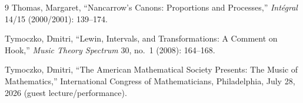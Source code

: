 \documentclass[11pt]{article}
\theoremstyle{plain}
\theoremstyle{definition}
\theoremstyle{remark}
\begin{document}
\begin{thebibliography}{9}
Thomas, Margaret, ``Nancarrow's Canons: Proportions and Processes,''  \emph{Int\'{e}gral} 14/15 (2000/2001): 139--174.

Tymoczko, Dmitri, ``Lewin, Intervals, and Transformations: A Comment on Hook,'' \emph{Music Theory Spectrum} 30, no.~1 (2008): 164--168.

Tymoczko, Dmitri, ``The American Mathematical Society Presents: The Music of Mathematics,'' International Congress of Mathematicians, Philadelphia, July 28, 2026 (guest lecture/performance).

\end{thebibliography}
\end{document}
